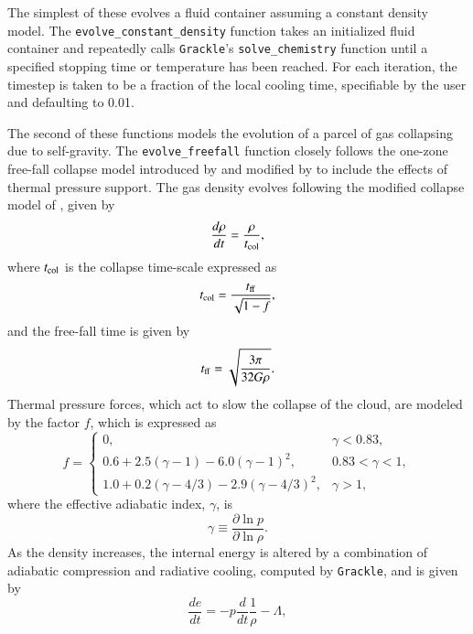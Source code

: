 The simplest of these evolves a fluid container assuming a constant
density model.  The \texttt{evolve\_constant\_density} function takes
an initialized fluid container and repeatedly calls \texttt{Grackle}'s
\texttt{solve\_chemistry} function until a specified stopping time or
temperature has been reached.  For each iteration, the timestep is
taken to be a fraction of the local cooling time, specifiable by the
user and defaulting to 0.01.

The second of these functions models the evolution of a parcel of gas
collapsing due to self-gravity.  The \texttt{evolve\_freefall} function
closely follows the one-zone free-fall collapse model introduced by
\citet{2000ApJ...534..809O} and modified by
\citet{2005ApJ...626..627O} to include the effects of thermal pressure
support.  The gas density evolves following the modified collapse
model of \citet{2005ApJ...626..627O}, given by
\begin{equation}
\frac{d \rho}{dt} = \frac{\rho}{t_{\rm col}},
\end{equation}
where $t_{\rm col}$ is the collapse time-scale expressed as
\begin{equation}
t_{\rm col} = \frac{t_{\rm ff}}{\sqrt{1-f}},
\end{equation}
and the free-fall time is given by
\begin{equation}
t_{\rm ff} = \sqrt{\frac{3 \pi}{32 G \rho}}.
\end{equation}
Thermal pressure forces, which act to slow the collapse of the cloud,
are modeled by the factor $f$, which is expressed as
\begin{equation}
f = \left\{
\begin{array}{lr}
0, & \gamma < 0.83,\\
0.6 + 2.5(\gamma - 1) - 6.0(\gamma - 1)^2, & 0.83 < \gamma < 1,\\
1.0 + 0.2(\gamma - 4/3) - 2.9(\gamma - 4/3)^2, & \gamma > 1,
\end{array}
 \right.
\end{equation}
where the effective adiabatic index, $\gamma$, is
\begin{equation}
\gamma \equiv \frac{\partial \ln p}{\partial \ln \rho}.
\end{equation}
As the density increases, the internal energy is altered by a
combination of adiabatic compression and radiative cooling, computed
by \texttt{Grackle}, and is given by
\begin{equation}
\frac{de}{dt}= -p \frac{d}{dt} \frac{1}{\rho} - {\Lambda},
\label{eq:energy}
\end{equation}
